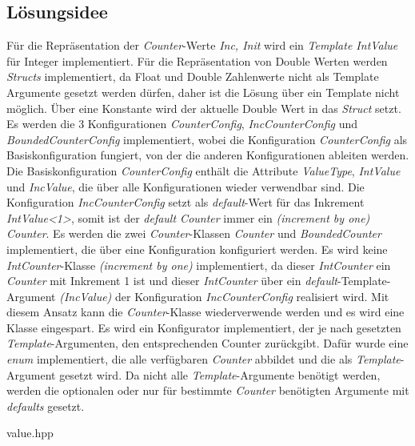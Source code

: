 \documentclass[11pt, a4paper, twoside]{article}   	%
\newcommand{\srcDirCounter}{../src/SolutionUebung1/Counter}
\newenvironment{code}{\captionsetup{type=listing}}{}
\begin{document}
\subsection{Lösungsidee}
Für die Repräsentation der \emph{Counter}-Werte \emph{Inc, Init} wird ein \emph{Template IntValue} für Integer implementiert. Für die Repräsentation von Double Werten werden \emph{Structs} implementiert, da Float und Double Zahlenwerte nicht als Template Argumente gesetzt werden dürfen, daher ist die Lösung über ein Template nicht möglich. Über eine Konstante wird der aktuelle Double Wert in das \emph{Struct} setzt.    
\newline
\newline
Es werden die 3 Konfigurationen \emph{CounterConfig}, \emph{IncCounterConfig} und \emph{BoundedCounterConfig} implementiert, wobei die Konfiguration \emph{CounterConfig} als Basiskonfiguration fungiert, von der die anderen Konfigurationen ableiten werden. Die Basiskonfiguration \emph{CounterConfig} enthält die Attribute \emph{ValueType}, \emph{IntValue} und \emph{IncValue}, die über alle Konfigurationen wieder verwendbar sind. Die Konfiguration \emph{IncCounterConfig} setzt als \emph{default}-Wert für das Inkrement \emph{IntValue<1>}, somit ist der \emph{default Counter} immer ein \emph{(increment by one) Counter}.
\newline
\newline
Es werden die zwei \emph{Counter}-Klassen \emph{Counter} und \emph{BoundedCounter} implementiert, die über eine Konfiguration konfiguriert werden. Es wird keine \emph{IntCounter}-Klasse \emph{(increment by one)} implementiert, da dieser \emph{IntCounter} ein \emph{Counter} mit Inkrement 1 ist und dieser \emph{IntCounter} über ein \emph{default}-Template-Argument \emph{(IncValue)} der Konfiguration \emph{IncCounterConfig} realisiert wird. Mit diesem Ansatz kann die \emph{Counter}-Klasse wiederverwende werden und es wird eine Klasse eingespart.
\newline
\newline
Es wird ein Konfigurator implementiert, der je nach gesetzten \emph{Template}-Argumenten, den entsprechenden Counter zurückgibt. Dafür wurde eine \emph{enum} implementiert, die alle verfügbaren \emph{Counter} abbildet und die als \emph{Template}-Argument gesetzt wird. Da nicht alle \emph{Template}-Argumente benötigt werden, werden die optionalen oder nur für bestimmte \emph{Counter} benötigten Argumente mit \emph{defaults} gesetzt.

\begin{code}
	\caption{value.hpp}
	\cppSourceFile{\srcDirCounter/value.hpp}
	\label{src:value-cpp}
\end{code}
\ \newpage
\end{document}
